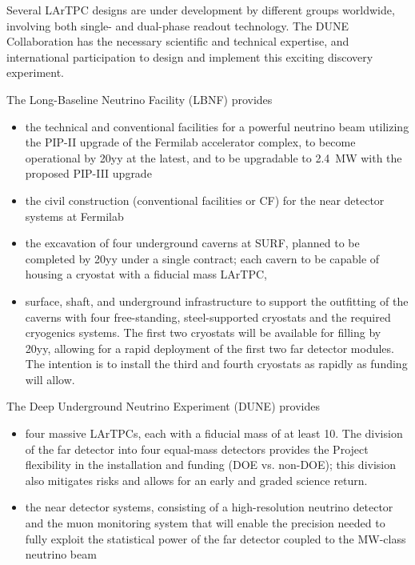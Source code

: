 Several LArTPC designs are under development by different groups worldwide, involving both single- and dual-phase readout technology.
The DUNE %
Collaboration has the necessary scientific and technical expertise, %
and international participation  to design and implement this exciting discovery experiment. 

The Long-Baseline Neutrino Facility (LBNF) provides

\begin{itemize}

\item  the  technical and conventional facilities for a powerful  neutrino beam utilizing the PIP-II upgrade of the Fermilab accelerator 
complex, to become operational by 20yy %
at the latest, and to be upgradable to \SI{2.4}{\MW} with the proposed 
PIP-III upgrade

\item  the civil construction (conventional facilities or CF) for the near detector systems at Fermilab 

\item the excavation of four underground caverns at SURF, planned to be completed 
by 20yy %
under a single contract; each cavern to be capable of housing a cryostat 
with a  fiducial mass LArTPC, %


\item surface, shaft, and underground infrastructure to support 
the outfitting of the caverns with four free-standing, steel-supported cryostats 
and the required cryogenics systems. The first two cryostats will be available for filling by
20yy, %
allowing for a rapid deployment of the first two  far detector modules. 
The intention is to install the third and fourth cryostats as rapidly as funding will 
allow.

\end{itemize}

The Deep Underground Neutrino Experiment (DUNE) provides
\begin{itemize}

\item four massive LArTPCs, each with a fiducial mass of at least \SI{10}{\kt}. The division of 
the far detector into four equal-mass detectors provides the Project flexibility 
in the installation and funding (DOE vs. non-DOE); this division also mitigates risks and allows for an early and graded science return.

\item the near detector systems, consisting of a high-resolution neutrino detector 
and the muon monitoring system that will enable %
the precision %
needed to fully 
exploit the statistical power of the %
far detector coupled to the %
MW-class 
neutrino beam
\end{itemize}


